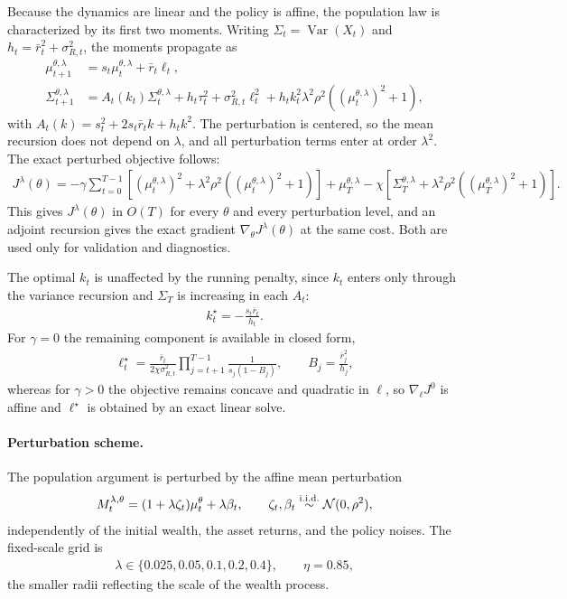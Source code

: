 Because the dynamics are linear and the policy is affine, the population law is characterized by its first two moments. Writing $\Sigma_t=\operatorname{Var}(X_t)$ and $h_t=\bar r_t^2+\sigma_{R,t}^2$, the moments propagate as
\begin{align}
    \mu_{t+1}^{\theta,\lambda}&=s_t\mu_t^{\theta,\lambda}+\bar r_t\ell_t, \label{eq:portfolio-mean-recursion}\\
    \Sigma_{t+1}^{\theta,\lambda}&=A_t(k_t)\Sigma_t^{\theta,\lambda}+h_t\tau_t^2+\sigma_{R,t}^2\ell_t^2+h_tk_t^2\lambda^2\rho^2\left((\mu_t^{\theta,\lambda})^2+1\right),
\end{align}
with $A_t(k)=s_t^2+2s_t\bar r_tk+h_tk^2$. The perturbation is centered, so the mean recursion does not depend on $\lambda$, and all perturbation terms enter at order $\lambda^2$. The exact perturbed objective follows:
\begin{align}
    J^\lambda(\theta)
    =
    -\gamma\sum_{t=0}^{T-1}\left[(\mu_t^{\theta,\lambda})^2+\lambda^2\rho^2\left((\mu_t^{\theta,\lambda})^2+1\right)\right]
    +\mu_T^{\theta,\lambda}
    -\chi\left[\Sigma_T^{\theta,\lambda}+\lambda^2\rho^2\left((\mu_T^{\theta,\lambda})^2+1\right)\right].
    \label{eq:portfolio-perturbed-objective}
\end{align}
This gives $J^\lambda(\theta)$ in $O(T)$ for every $\theta$ and every perturbation level, and an adjoint recursion gives the exact gradient $\nabla_\theta J^\lambda(\theta)$ at the same cost. Both are used only for validation and diagnostics.

The optimal $k_t$ is unaffected by the running penalty, since $k_t$ enters only through the variance recursion and $\Sigma_T$ is increasing in each $A_t$:
\begin{align}
    k_t^\star=-\frac{s_t\bar r_t}{h_t}.
    \label{eq:portfolio-optimal-k}
\end{align}
For $\gamma=0$ the remaining component is available in closed form,
\begin{align}
    \ell_t^\star=\frac{\bar r_t}{2\chi\sigma_{R,t}^2}\prod_{j=t+1}^{T-1}\frac{1}{s_j(1-B_j)},
    \qquad
    B_j=\frac{\bar r_j^2}{h_j},
    \label{eq:portfolio-optimal-l}
\end{align}
whereas for $\gamma>0$ the objective remains concave and quadratic in $\ell$, so $\nabla_\ell J^0$ is affine and $\ell^\star$ is obtained by an exact linear solve.

\paragraph{Perturbation scheme.}
The population argument is perturbed by the affine mean perturbation
\begin{align}
    M_t^{\lambda,\theta}=(1+\lambda\zeta_t)\mu_t^\theta+\lambda\beta_t,
    \qquad
    \zeta_t,\beta_t\overset{\mathrm{i.i.d.}}{\sim}{\cal N}(0,\rho^2),
\end{align}
independently of the initial wealth, the asset returns, and the policy noises. The fixed-scale grid is
\begin{align}
    \lambda\in\{0.025,0.05,0.1,0.2,0.4\},
    \qquad
    \eta=0.85,
\end{align}
the smaller radii reflecting the scale of the wealth process.

